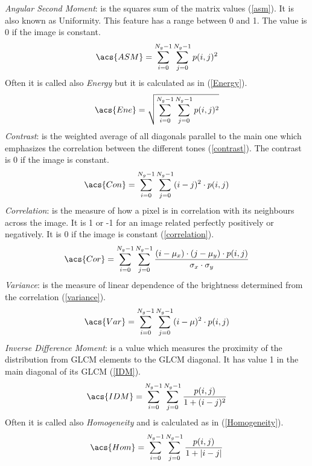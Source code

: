 \documentclass[final,a4paper,12pt,english]{UnicaPhdThesis3}
\begin{document}
\noindent\textit{Angular Second Moment}: is the squares sum of the matrix values (\ref{asm}). It is also known as Uniformity. This feature has a range between 0 and 1. The value is 0 if the image is constant.\\
\begin{equation}\label{asm}
\acs{ASM}=\sum_{i=0}^{N_{g}-1}\sum_{j=0}^{N_{g}-1}p(i,j)^2
\end{equation}
Often it is called also \textit{Energy} but it is calculated as in (\ref{Energy}).
\begin{equation}\label{Energy}
\acs{Ene}=\sqrt{\sum_{i=0}^{N_{g}-1}\sum_{j=0}^{N_{g}-1}p(i,j)^2}
\end{equation}
\textit{Contrast}: is the weighted average of all diagonals parallel to the main one which emphasizes the correlation between the different tones (\ref{contrast}). The contrast is 0 if the image is constant.
\begin{equation}\label{contrast}
\acs{Con}=\sum_{i=0}^{N_{g}-1}\sum_{j=0}^{N_{g}-1} (i-j)^2 \cdot p(i,j)
\end{equation}
\textit{Correlation}: is the measure of how a pixel is in correlation with its neighbours across the image. It is 1 or -1 for an image related perfectly positively or negatively. It is 0 if the image is constant (\ref{correlation}).
\begin{equation}\label{correlation}
\acs{Cor}=\sum_{i=0}^{N_{g}-1}\sum_{j=0}^{N_{g}-1}  \frac{(i-\mu_x) \cdot (j-\mu_y) \cdot p(i,j)}{\sigma_x \cdot \sigma_y}
\end{equation}
\textit{Variance}: is the measure of linear dependence of the brightness determined from the correlation (\ref{variance}).
\begin{equation}\label{variance}
\acs{Var}=\sum_{i=0}^{N_{g}-1}\sum_{j=0}^{N_{g}-1}(i-\mu)^2 \cdot p(i,j)
\end{equation}
\textit{Inverse Difference Moment}: is a value which measures the proximity of the distribution from GLCM elements to the GLCM diagonal. It has value 1 in the main diagonal of its GLCM (\ref{IDM}).
\begin{equation}\label{IDM}
\acs{IDM}=\sum_{i=0}^{N_{g}-1}\sum_{j=0}^{N_{g}-1}\frac{p(i,j)}{1 + (i-j)^2}
\end{equation}
Often it is called also \textit{Homogeneity} and is calculated as in (\ref{Homogeneity}).
\begin{equation}\label{Homogeneity}
\acs{Hom}=\sum_{i=0}^{N_{g}-1}\sum_{j=0}^{N_{g}-1}\frac{p(i,j)}{1 + |i-j|}
\end{equation}
\end{document}

